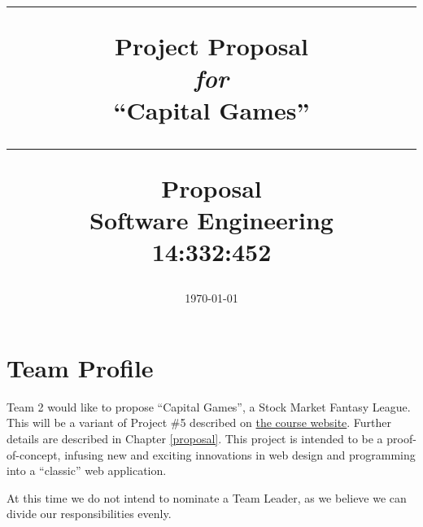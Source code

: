 \documentclass[11pt,letterpaper,oneside]{memoir}
\title{%
{\color{color2} \hrule}\vspace{1cm}
\Huge{\color{color1} Project Proposal\\ %
{\emph{for}}\\
``Capital Games'' \vspace{1cm}
}
{\color{color2} \hrule}\vspace{1cm}
\Large{ \color{color2} Proposal\\
Software Engineering\\
14:332:452}
}
\author{\huge{\color{color1}Team 2:\\}\vskip.1in \Large{Jeff Adler \\Eric Cuiffo\\Nick Palumbo\\Jeff Rabinowitz\\Val Red\\Dario Rethage}}
\date{\Large{\today}}
\begin{document}
\titleGM    %


\pagebreak  %
\tableofcontents %
\chapter{Team Profile}
Team 2 would like to propose ``Capital Games'', a Stock Market Fantasy League.
This will be a variant of Project \#5 described on
\href{http://www.ece.rutgers.edu/~marsic/books/SE/projects/}{the course website}.
Further details are described in Chapter \ref{proposal}. This project is intended
to be a proof-of-concept, infusing new and exciting innovations in web
design and programming into a ``classic'' web application.

At this time we do not intend to nominate a Team Leader, as we believe we can 
divide our responsibilities evenly.
\end{document}
